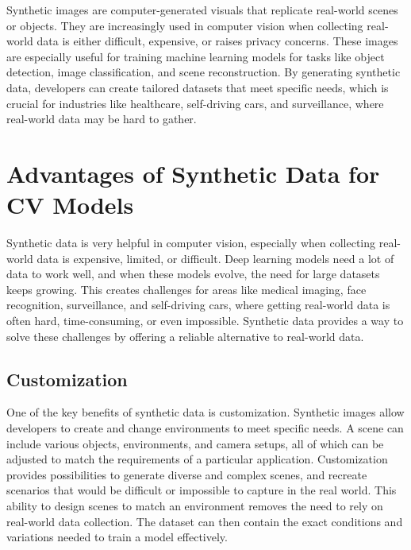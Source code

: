 Synthetic images are computer-generated visuals that replicate real-world scenes or objects. They are increasingly used in computer vision when collecting real-world data is either difficult, expensive, or raises privacy concerns. These images are especially useful for training machine learning models for tasks like object detection, image classification, and scene reconstruction. By generating synthetic data, developers can create tailored datasets that meet specific needs, which is crucial for industries like healthcare, self-driving cars, and surveillance, where real-world data may be hard to gather. \cite{jimaging8110310}

\section{Advantages of Synthetic Data for CV Models}

Synthetic data is very helpful in computer vision, especially when collecting real-world data is expensive, limited, or difficult. Deep learning models need a lot of data to work well, and when these models evolve, the need for large datasets keeps growing. \cite{10.1145/3042064, nikolenko2021synthetic} This creates challenges for areas like medical imaging, face recognition, surveillance, and self-driving cars, where getting real-world data is often hard, time-consuming, or even impossible. \cite{10.1007/978-3-642-15549-9_55} Synthetic data provides a way to solve these challenges by offering a reliable alternative to real-world data.

\subsection{Customization}
One of the key benefits of synthetic data is customization. Synthetic images allow developers to create and change environments to meet specific needs. A scene can include various objects, environments, and camera setups, all of which can be adjusted to match the requirements of a particular application. \cite{jimaging8110310, rajpura2017objectdetectionusingdeep} Customization provides possibilities to generate diverse and complex scenes, and recreate scenarios that would be difficult or impossible to capture in the real world. This ability to design scenes to match an environment removes the need to rely on real-world data collection. The dataset can then contain the exact conditions and variations needed to train a model effectively. 

